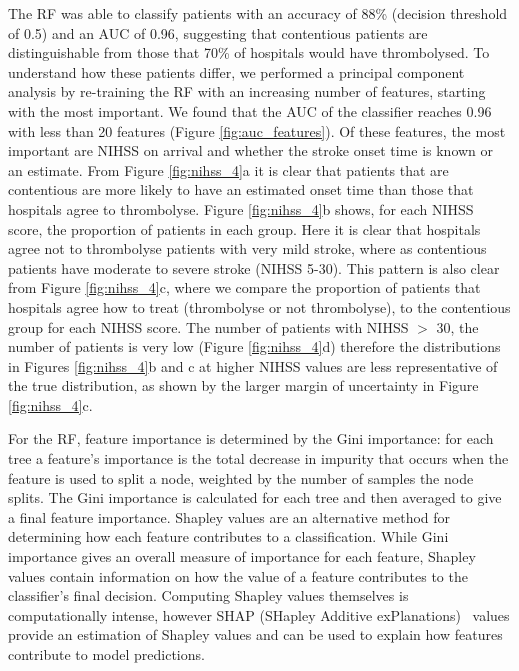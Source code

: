\documentclass[12pt,a4paper, pdftex]{elsarticle}
\begin{document}
The RF was able to classify patients with an accuracy of 88\% (decision threshold of 0.5) and an AUC of 0.96, suggesting that contentious patients are distinguishable from those that 70\% of hospitals would have thrombolysed. To understand how these patients differ, we performed a principal component analysis by re-training the RF with an increasing number of features, starting with the most important. We found that the AUC of the classifier reaches 0.96 with less than 20 features (Figure \ref{fig:auc_features}). Of these features, the most important are NIHSS on arrival and whether the stroke onset time is known or an estimate. 
From Figure \ref{fig:nihss_4}a it is clear that patients that are contentious are more likely to have an estimated onset time than those that hospitals agree to thrombolyse. Figure \ref{fig:nihss_4}b shows, for each NIHSS score, the proportion of patients in each group. Here it is clear that hospitals agree not to thrombolyse patients with very mild stroke, where as contentious patients have moderate to severe stroke (NIHSS 5-30). This pattern is also clear from Figure \ref{fig:nihss_4}c, where we compare the proportion of patients that hospitals agree how to treat (thrombolyse or not thrombolyse), to the contentious group for each NIHSS score. The number of patients with NIHSS $>$ 30, the number of patients is very low (Figure \ref{fig:nihss_4}d) therefore the distributions in Figures \ref{fig:nihss_4}b and c at higher NIHSS values are less representative of the true distribution, as shown by the larger margin of uncertainty in Figure \ref{fig:nihss_4}c. 

For the RF, feature importance is determined by the Gini importance: for each tree a feature’s importance is the total decrease in impurity that occurs when the feature is used to split a node, weighted by the number of samples the node splits. The Gini importance is calculated for each tree and then averaged to give a final feature importance.  Shapley values are an alternative method for determining how each feature contributes to a classification. While Gini importance gives an overall measure of importance for each feature, Shapley values contain information on how the value of a feature contributes to the classifier's final decision. Computing Shapley values themselves is computationally intense, however SHAP (SHapley Additive exPlanations)~\cite{NIPS2017_7062} values provide an estimation of Shapley values and can be used to explain how features contribute to model predictions.
\end{document}
